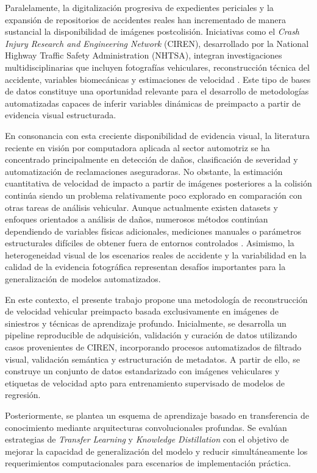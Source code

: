 \documentclass[esp]{cesvi-class}
\begin{document}
Paralelamente, la digitalización progresiva de expedientes periciales y la expansión de repositorios de accidentes reales han incrementado de manera sustancial la disponibilidad de imágenes postcolisión. Iniciativas como el \textit{Crash Injury Research and Engineering Network} (CIREN), desarrollado por la National Highway Traffic Safety Administration (NHTSA), integran investigaciones multidisciplinarias que incluyen fotografías vehiculares, reconstrucción técnica del accidente, variables biomecánicas y estimaciones de velocidad \cite{NHTSA_CIREN,Digges2005CIREN}. Este tipo de bases de datos constituye una oportunidad relevante para el desarrollo de metodologías automatizadas capaces de inferir variables dinámicas de preimpacto a partir de evidencia visual estructurada.

En consonancia con esta creciente disponibilidad de evidencia visual, la literatura reciente en visión por computadora aplicada al sector automotriz se ha concentrado principalmente en detección de daños, clasificación de severidad y automatización de reclamaciones aseguradoras. No obstante, la estimación cuantitativa de velocidad de impacto a partir de imágenes posteriores a la colisión continúa siendo un problema relativamente poco explorado en comparación con otras tareas de análisis vehicular. Aunque actualmente existen datasets y enfoques orientados a análisis de daños, numerosos métodos continúan dependiendo de variables físicas adicionales, mediciones manuales o parámetros estructurales difíciles de obtener fuera de entornos controlados \cite{FrickeTrafficCrashReconstruction,BrachBrach2011}. Asimismo, la heterogeneidad visual de los escenarios reales de accidente y la variabilidad en la calidad de la evidencia fotográfica representan desafíos importantes para la generalización de modelos automatizados.

En este contexto, el presente trabajo propone una metodología de reconstrucción de velocidad vehicular preimpacto basada exclusivamente en imágenes de siniestros y técnicas de aprendizaje profundo. Inicialmente, se desarrolla un pipeline reproducible de adquisición, validación y curación de datos utilizando casos provenientes de CIREN, incorporando procesos automatizados de filtrado visual, validación semántica y estructuración de metadatos. A partir de ello, se construye un conjunto de datos estandarizado con imágenes vehiculares y etiquetas de velocidad apto para entrenamiento supervisado de modelos de regresión.

Posteriormente, se plantea un esquema de aprendizaje basado en transferencia de conocimiento mediante arquitecturas convolucionales profundas. Se evalúan estrategias de \textit{Transfer Learning} y \textit{Knowledge Distillation} con el objetivo de mejorar la capacidad de generalización del modelo y reducir simultáneamente los requerimientos computacionales para escenarios de implementación práctica.
\end{document}

